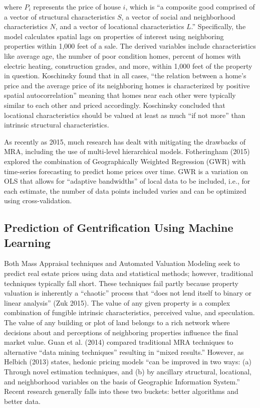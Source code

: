 \documentclass[12pt,]{article}
\begin{document}
\noindent where \(P_i\) represents the price of house \(i\), which is
``a composite good comprised of a vector of structural characteristics
\(S\), a vector of social and neighborhood characteristics \(N\), and a
vector of locational characteristics \(L\).'' Specifically, the model
calculates spatial lags on properties of interest using neighboring
properties within 1,000 feet of a sale. The derived variables include
characteristics like average age, the number of poor condition homes,
percent of homes with electric heating, construction grades, and more,
within 1,000 feet of the property in question. Koschinsky found that in
all cases, ``the relation between a home's price and the average price
of its neighboring homes is characterized by positive spatial
autocorrelation'' meaning that homes near each other were typically
similar to each other and priced accordingly. Koschinsky concluded that
locational characteristics should be valued at least as much ``if not
more'' than intrinsic structural characteristics.

As recently as 2015, much research has dealt with mitigating the
drawbacks of MRA, including the use of multi-level hierarchical models.
Fotheringham (2015) explored the combination of Geographically Weighted
Regression (GWR) with time-series forecasting to predict home prices
over time. GWR is a variation on OLS that allows for ``adaptive
bandwidths'' of local data to be included, i.e., for each estimate, the
number of data points included varies and can be optimized using
cross-validation.

\hypertarget{prediction-of-gentrification-using-machine-learning}{%
\subsection{Prediction of Gentrification Using Machine
Learning}\label{prediction-of-gentrification-using-machine-learning}}

Both Mass Appraisal techniques and Automated Valuation Modeling seek to
predict real estate prices using data and statistical methods; however,
traditional techniques typically fall short. These techniques fail
partly because property valuation is inherently a ``chaotic'' process
that ``does not lend itself to binary or linear analysis'' (Zuk 2015).
The value of any given property is a complex combination of fungible
intrinsic characteristics, perceived value, and speculation. The value
of any building or plot of land belongs to a rich network where
decisions about and perceptions of neighboring properties influence the
final market value. Guan et al. (2014) compared traditional MRA
techniques to alternative ``data mining techniques'' resulting in
``mixed results.'' However, as Helbich (2013) states, hedonic pricing
models ``can be improved in two ways: (a) Through novel estimation
techniques, and (b) by ancillary structural, locational, and
neighborhood variables on the basis of Geographic Information System.''
Recent research generally falls into these two buckets: better
algorithms and better data.
\end{document}
